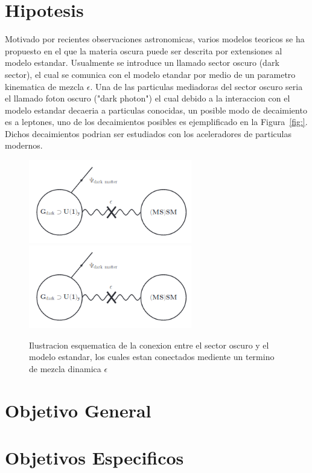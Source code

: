 \chapter{Hipotesis}
Motivado por recientes observaciones astronomicas, varios modelos teoricos se ha propuesto en el que la materia oscura puede ser descrita por extensiones al modelo estandar. Usualmente se introduce un llamado sector oscuro (dark sector), el cual se comunica con el modelo etandar por medio de un parametro kinematica de mezcla $\epsilon$. Una de las particulas mediadoras del sector oscuro seria el llamado foton oscuro ("dark photon") el cual debido a la interaccion con el modelo estandar decaeria a particulas conocidas, un posible modo de decaimiento es a leptones, uno de los decaimientos posibles es ejemplificado en la Figura~\ref{fig:}.  Dichos decaimientos podrian ser estudiados con los aceleradores de particulas modernos. 


\begin{figure}
\begin{center}
  \includegraphics[width=2.8in]{sketch_darksector.png}
  \includegraphics[width=2.8in]{sketch_darksector.png}
  \caption{Ilustracion esquematica de la conexion entre el sector oscuro y el modelo estandar, los cuales estan conectados mediente un termino de mezcla dinamica $\epsilon$}
  \label{fig:AMS_positron}
\end{center}
\end{figure}


\chapter{Objetivo General}
\chapter{Objetivos Especificos}

